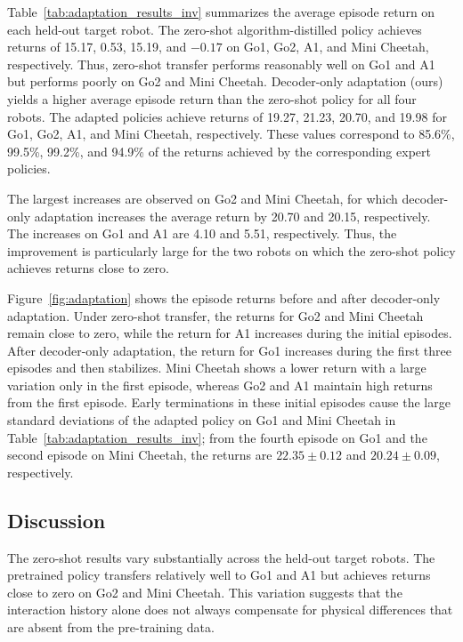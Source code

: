 \documentclass[runningheads]{llncs}
\begin{document}
Table~\ref{tab:adaptation_results_inv} summarizes the average episode return on each held-out target robot. 
The zero-shot algorithm-distilled policy achieves returns of 15.17, 0.53, 15.19, and $-0.17$ on Go1, Go2, A1, and Mini Cheetah, respectively.
Thus, zero-shot transfer performs reasonably well on Go1 and A1 but performs poorly on Go2 and Mini Cheetah.
Decoder-only adaptation (ours) yields a higher average episode return than the zero-shot policy for all four robots.
The adapted policies achieve returns of 19.27, 21.23, 20.70, and 19.98 for Go1, Go2, A1, and Mini Cheetah, respectively. These values correspond to 85.6\%, 99.5\%, 99.2\%, and 94.9\% of the returns achieved by the corresponding expert policies.


The largest increases are observed on Go2 and Mini Cheetah, for which
decoder-only adaptation increases the average return by 20.70 and
20.15, respectively.
The increases on Go1 and A1 are 4.10 and 5.51, respectively.
Thus, the improvement is particularly large for the two robots on which
the zero-shot policy achieves returns close to zero.


Figure~\ref{fig:adaptation} shows the episode returns before and after decoder-only adaptation.
Under zero-shot transfer, the returns for Go2 and Mini Cheetah remain
close to zero, while the return for A1 increases during the initial
episodes.
After decoder-only adaptation, the return for Go1 increases during the first three episodes and then stabilizes.
Mini Cheetah shows a lower return with a large variation only in the first episode,
whereas Go2 and A1 maintain high returns from the first episode.
Early terminations in these initial episodes cause the large standard deviations of the adapted policy on Go1 and Mini Cheetah in Table~\ref{tab:adaptation_results_inv}; from the fourth episode on Go1 and the second episode on Mini Cheetah, the returns are $22.35 \pm 0.12$ and $20.24 \pm 0.09$, respectively.

\subsection{Discussion}
The zero-shot results vary substantially across the held-out target robots.
The pretrained policy transfers relatively well to Go1 and A1 but achieves returns close to zero on Go2 and Mini Cheetah.
This variation suggests that the interaction history alone does not always compensate for physical differences that are absent from the pre-training data.
\end{document}
